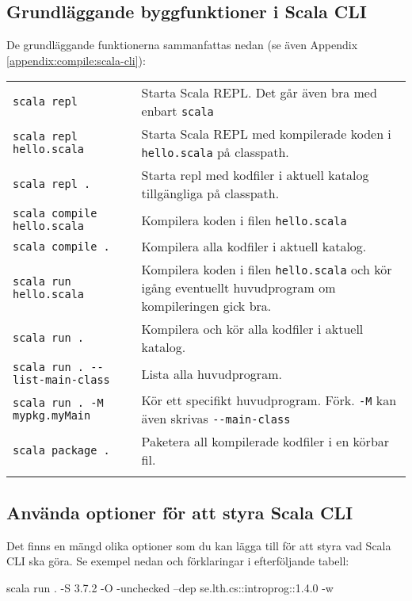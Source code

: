 \subsection{Grundläggande byggfunktioner i Scala CLI}

De grundläggande funktionerna sammanfattas nedan (se även Appendix \ref{appendix:compile:scala-cli}):

\begin{table}[H]
\begin{tabular}{l p{6.5cm}}
\texttt{scala repl} & Starta Scala REPL.  Det går även bra med enbart \texttt{scala}\\
\texttt{scala repl hello.scala} & Starta Scala REPL med kompilerade koden i \texttt{hello.scala} på classpath.  \\
\texttt{scala repl .} & Starta repl med kodfiler i aktuell katalog tillgängliga på classpath. \\
\texttt{scala compile hello.scala} & Kompilera koden i filen \texttt{hello.scala}  \\
\texttt{scala compile .} & Kompilera alla kodfiler i aktuell katalog. \\
\texttt{scala run hello.scala} & Kompilera koden i filen \texttt{hello.scala} och kör igång eventuellt huvudprogram om kompileringen gick bra. \\
\texttt{scala run .} & Kompilera och kör alla kodfiler i aktuell katalog. \\
\texttt{scala run . -{}-list-main-class} & Lista alla huvudprogram. \\
\texttt{scala run . -M mypkg.myMain} & Kör ett specifikt huvudprogram. Förk. \texttt{-M} kan även skrivas \texttt{-{}-main-class}\\
\texttt{scala package .} & Paketera all kompilerade kodfiler i en körbar fil. \\
\\
\end{tabular}
\end{table}

\subsection{Använda optioner för att styra Scala CLI}

\noindent Det finns en mängd olika optioner som du kan lägga till för att styra vad Scala CLI ska göra. Se exempel nedan och förklaringar i efterföljande tabell:
\begin{REPLsmall}
scala run . -S 3.7.2 -O -unchecked --dep se.lth.cs::introprog::1.4.0 -w
\end{REPLsmall}

